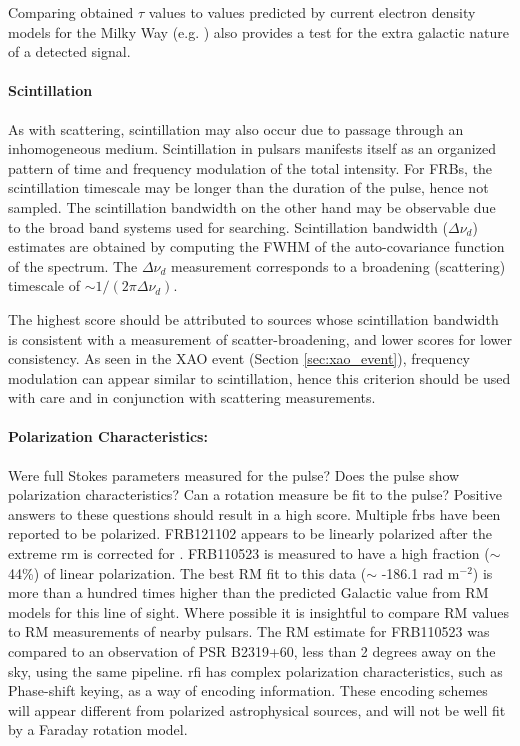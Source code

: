 \documentclass[a4paper,fleqn,usenatbib]{mnras}
\begin{document}
Comparing obtained $\tau$ values to values predicted by current
electron density models for the Milky Way (e.g.
\citealt{2002astro.ph..7156C,2017ApJ...835...29Y}) also provides a test for the extra galactic nature of a detected signal.

\paragraph{Scintillation}

As with scattering, scintillation may also occur due to passage through an inhomogeneous medium. Scintillation in pulsars manifests itself as an organized pattern of time and frequency modulation of the total intensity. For FRBs, the scintillation timescale may be longer than the duration of the pulse, hence not sampled. The scintillation bandwidth on the other hand may be observable due to the broad band systems used for searching.  Scintillation bandwidth ($\Delta \nu_d$) estimates are obtained by computing the FWHM of the 
auto-covariance function of the spectrum.  The $\Delta
\nu_d$ measurement corresponds to a broadening (scattering) timescale of $\sim
1/(2\pi\Delta \nu_d)$.  

The highest score should be attributed to sources whose scintillation bandwidth is consistent with a measurement of scatter-broadening, and lower scores for lower consistency. As seen in the XAO event (Section
\ref{sec:xao_event}), frequency modulation can appear similar to scintillation, hence this criterion should be used with care and in conjunction with scattering measurements. 

\paragraph{Polarization Characteristics:}

Were full Stokes parameters measured for the pulse? Does the pulse show
polarization characteristics? Can a rotation measure be fit to the pulse? Positive answers to these questions should result in a high score. 
Multiple \glspl{frb} have been reported to be polarized.  FRB121102 appears to
be linearly polarized after the extreme \gls{rm} is corrected for
\citep{2018Natur.553..182M}. FRB110523 is measured to have a high fraction
($\sim$ 44\%) of linear polarization. The best RM fit to this data ($\sim$
-186.1 rad m$^{-2}$) is more than a hundred times higher than the predicted
Galactic value from RM models for this line of sight. Where possible it is
insightful to compare RM values to RM measurements of nearby pulsars. The RM
estimate for FRB110523 was compared to an observation of PSR B2319+60, less than
2 degrees away on the sky, using the same pipeline.  \gls{rfi} has complex
polarization characteristics, such as Phase-shift keying, as a way of encoding
information.  These encoding schemes will appear different from polarized
astrophysical sources, and will not be well fit by a Faraday rotation model.
\end{document}
